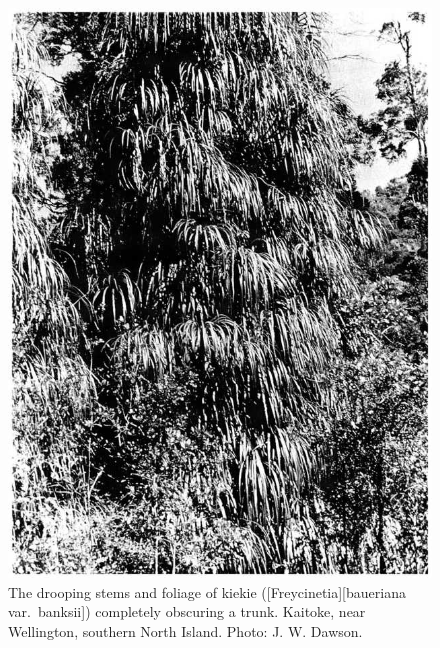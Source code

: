 \begin{figure}[htb]
	\centering
	\begin{minipage}[t]{0.502\textwidth}
		\centering
		\includegraphics[width=\textwidth]{graphics/figure32kiekie.jpg}
    	\caption[The drooping stems and foliage of kiekie]{The drooping stems and foliage of kiekie ([Freycinetia][baueriana var.\ banksii]) completely obscuring a  trunk. Kaitoke, near Wellington, southern North Island. Photo: J. W. Dawson.}%
    	\label{fig:32kiekie}
	\end{minipage}\hfill%
	\begin{minipage}[t]{0.478\textwidth}
    	\centering

\end{minipage}
\end{figure}
